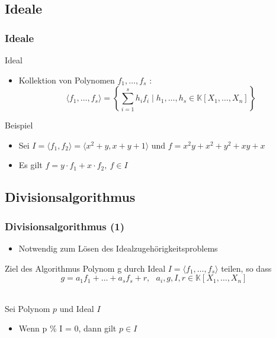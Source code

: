 \documentclass{beamer}
\begin{document}
\subsection{Ideale}

\begin{frame}[<+->][fragile]
\frametitle{Ideale}

\begin{block}{Ideal }
\begin{itemize}
\item Kollektion von Polynomen $f_{1}, \dots , f_{s}$ : \\
\[ \langle f_{1}, \dots , f_{s} \rangle = \left\lbrace  \sum_{i=1}^s h_{i}f_{i} \mid h_{1}, \dots , h_{s} \in \mathbb{K}\left[X_{1}, \dots, X_{n}\right] \right\rbrace \] 
 
\end{itemize}

\end{block}

\begin{block}{Beispiel}
\begin{itemize}
\item
Sei $ I= \langle f_{1},f_{2} \rangle = \langle x^{2}+y, x+y+1 \rangle $ und $f=x^{2}y+x^{2}+y^{2}+xy+x$ 

\item 
Es gilt $f= y \cdot f_{1} + x \cdot f_{2},~f\in I$
\end{itemize}


\end{block}


\end{frame}
\subsection{Divisionsalgorithmus}
\begin{frame}[<+->]
\frametitle{Divisionsalgorithmus (1)}



\begin{itemize}
\item Notwendig zum Lösen des Idealzugehörigkeitsproblems


\end{itemize}

\begin{block}{Ziel des Algorithmus}
Polynom g durch Ideal $ I = \langle f_{1}, \dots , f_{s} \rangle  $ teilen, so dass 
\[ g = a_{1}f_{1} + \ldots + a_{s}f_{s} + r ,~~~ a_{i},g,I,r \in \mathbb{K}\left[X_{1}, \dots, X_{n}\right]  \]
\end{block}

~\\

Sei Polynom $p$ und Ideal $I$  

\begin{itemize}
\item Wenn p \% I = 0, dann gilt $ p \in I$


\end{itemize}



	
\end{frame}
\end{document}
